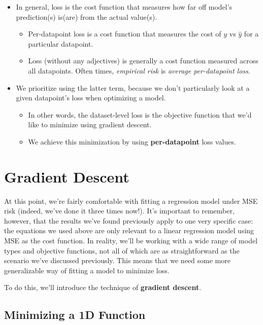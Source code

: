 \documentclass[
  letterpaper,
  DIV=11,
  numbers=noendperiod]{scrreprt}
\providecommand{\tightlist}{%
  \setlength{\itemsep}{0pt}\setlength{\parskip}{0pt}}\usepackage{longtable,booktabs,array}
\begin{document}
\begin{itemize}
\item
  In general, loss is the cost function that measures how far off
  model's prediction(s) is(are) from the actual value(s).

  \begin{itemize}
  \tightlist
  \item
    Per-datapoint loss is a cost function that measures the cost of
    \(y\) vs \(\hat{y}\) for a particular datapoint.
  \item
    Loss (without any adjectives) is generally a cost function measured
    across all datapoints. Often times, \emph{empirical risk} is
    \emph{average per-datapoint loss}.
  \end{itemize}
\item
  We prioritize using the latter term, because we don't particularly
  look at a given datapoint's loss when optimizing a model.

  \begin{itemize}
  \tightlist
  \item
    In other words, the dataset-level loss is the objective function
    that we'd like to minimize using gradient descent.
  \item
    We achieve this minimization by using \textbf{per-datapoint} loss
    values.
  \end{itemize}
\end{itemize}

\hypertarget{gradient-descent-1}{%
\section{Gradient Descent}\label{gradient-descent-1}}

At this point, we're fairly comfortable with fitting a regression model
under MSE risk (indeed, we've done it three times now!). It's important
to remember, however, that the results we've found previously apply to
one very specific case: the equations we used above are only relevant to
a linear regression model using MSE as the cost function. In reality,
we'll be working with a wide range of model types and objective
functions, not all of which are as straightforward as the scenario we've
discussed previously. This means that we need some more generalizable
way of fitting a model to minimize loss.

To do this, we'll introduce the technique of \textbf{gradient descent}.

\hypertarget{minimizing-a-1d-function}{%
\subsection{Minimizing a 1D Function}\label{minimizing-a-1d-function}}
\end{document}
